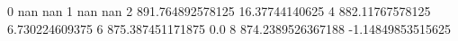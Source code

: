 0 nan nan
1 nan nan
2 891.764892578125 16.37744140625
4 882.11767578125 6.730224609375
6 875.387451171875 0.0
8 874.2389526367188 -1.14849853515625
